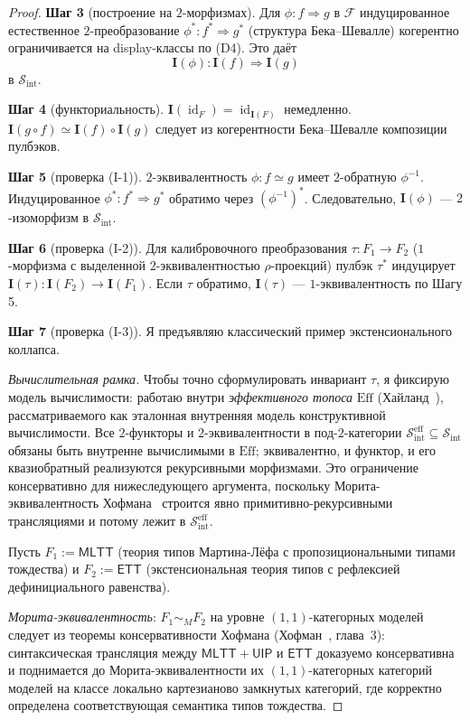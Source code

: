 \documentclass[11pt]{article}
\theoremstyle{plain}
\theoremstyle{definition}
\newcommand{\cS}{\mathcal{S}}
\newcommand{\cF}{\mathcal{F}}
\newcommand{\Sint}{\cS_{\mathrm{int}}}
\newcommand{\MLTT}{\mathsf{MLTT}}
\newcommand{\ETT}{\mathsf{ETT}}
\newcommand{\II}{\mathbf{I}}
\DeclareMathOperator{\id}{id}
\begin{document}
\begin{proof}
\textbf{Шаг 3} (построение на $2$-морфизмах). Для $\phi : f \Rightarrow g$ в $\cF$ индуцированное естественное $2$-преобразование $\phi^* : f^* \Rightarrow g^*$ (структура Бека--Шевалле) когерентно ограничивается на display-классы по (D4). Это даёт
\[ \II(\phi) : \II(f) \Rightarrow \II(g) \]
в $\Sint$.

\textbf{Шаг 4} (функториальность). $\II(\id_F) = \id_{\II(F)}$ немедленно. $\II(g \circ f) \simeq \II(f) \circ \II(g)$ следует из когерентности Бека--Шевалле композиции пулбэков.

\textbf{Шаг 5} (проверка (I-1)). $2$-эквивалентность $\phi : f \simeq g$ имеет $2$-обратную $\phi^{-1}$. Индуцированное $\phi^* : f^* \Rightarrow g^*$ обратимо через $(\phi^{-1})^*$. Следовательно, $\II(\phi)$ — $2$-изоморфизм в $\Sint$.

\textbf{Шаг 6} (проверка (I-2)). Для калибровочного преобразования $\tau : F_1 \to F_2$ ($1$-морфизма с выделенной $2$-эквивалентностью $\rho$-проекций) пулбэк $\tau^*$ индуцирует $\II(\tau) : \II(F_2) \to \II(F_1)$. Если $\tau$ обратимо, $\II(\tau)$ — $1$-эквивалентность по Шагу 5.

\textbf{Шаг 7} (проверка (I-3)). Я предъявляю классический пример экстенсионального коллапса.

\emph{Вычислительная рамка.} Чтобы точно сформулировать инвариант $\tau$, я фиксирую модель вычислимости: работаю внутри \emph{эффективного топоса} $\mathrm{Eff}$ (Хайланд~\cite{Hyland1982}), рассматриваемого как эталонная внутренняя модель конструктивной вычислимости. Все $2$-функторы и $2$-эквивалентности в под-$2$-категории $\Sint^{\mathrm{eff}} \subseteq \Sint$ обязаны быть внутренне вычислимыми в $\mathrm{Eff}$; эквивалентно, и функтор, и его квазиобратный реализуются рекурсивными морфизмами. Это ограничение консервативно для нижеследующего аргумента, поскольку Морита-эквивалентность Хофмана~\cite{Hofmann1995} строится явно примитивно-рекурсивными трансляциями и потому лежит в $\Sint^{\mathrm{eff}}$.

Пусть $F_1 := \MLTT$ (теория типов Мартина-Лёфа с пропозициональными типами тождества) и $F_2 := \ETT$ (экстенсиональная теория типов с рефлексией дефинициального равенства).

\emph{Морита-эквивалентность}: $F_1 \sim_M F_2$ на уровне $(1, 1)$-категорных моделей следует из теоремы консервативности Хофмана (Хофман~\cite{Hofmann1995}, глава~3): синтаксическая трансляция между $\MLTT + \mathsf{UIP}$ и $\ETT$ доказуемо консервативна и поднимается до Морита-эквивалентности их $(1, 1)$-категорных категорий моделей на классе локально картезианово замкнутых категорий, где корректно определена соответствующая семантика типов тождества.


\end{proof}
\end{document}
